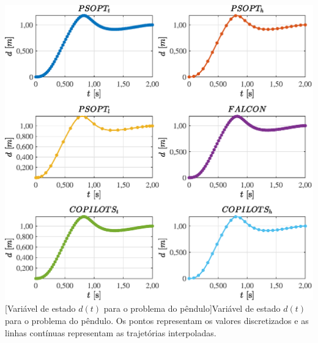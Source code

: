 \noindent
\begin{minipage}{\textwidth}
	\vspace{\onelineskip}
	\centering
	\includegraphics[scale=0.7]{fig/resultados/penduloInvertido/traj/x/d}
	[Variável de estado $d(t)$ para o problema do pêndulo]{Variável de estado $d(t)$ para o problema do pêndulo. Os pontos representam os valores discretizados e as linhas contínuas representam as trajetórias interpoladas.}
	\label{fig:penduloInvertido:x:d}
	\vspace{\onelineskip}
\end{minipage}

